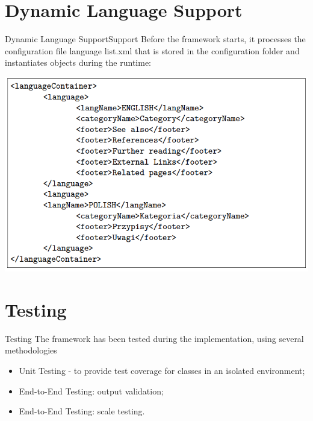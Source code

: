 \documentclass[czech,aspectratio=169]{beamer}
\begin{document}
	\section{Dynamic Language Support}
	\begin{frame}{Dynamic Language Support}{Support}
		Before the framework starts, it processes the
		configuration file language list.xml that is stored in the configuration folder and instantiates objects during the runtime:
		\begin{center}
			\includegraphics[width=0.45\paperwidth]{lang_config.png}
		\end{center}
	\end{frame}
    
    \section{Testing}
    \begin{frame}{Testing}
    	The framework has been tested during the implementation, using several methodologies
        \begin{itemize}
            \item Unit Testing - to provide test coverage for classes in an isolated environment;
            \item End-to-End Testing: output validation;
            \item End-to-End Testing: scale testing.
        \end{itemize}
    \end{frame}
\end{document}
